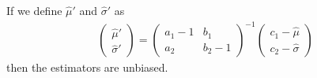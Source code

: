 \documentclass[a4paper,10pt]{article}
\begin{document}
   If we define $\hat{\mu}'$ and $\hat{\sigma}'$ as
   \begin{align}
      \begin{pmatrix} \hat{\mu}' \\ \hat{\sigma}' \end{pmatrix}
      =
      \begin{pmatrix} a_1 - 1 & b_1 \\ a_2 & b_2 - 1 \end{pmatrix}^{-1}
      \begin{pmatrix} c_1 - \hat{\mu} \\ c_2 - \hat{\sigma} \end{pmatrix}
   \end{align}
   then the estimators are unbiased.
\end{document}
